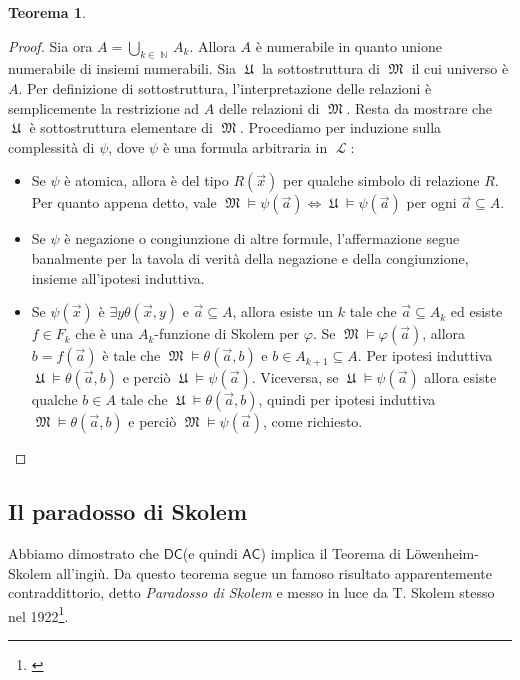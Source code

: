 \documentclass[12pt,a4paper]{report}
\theoremstyle{definition}
\newtheorem{teo}{Teorema}[section]  %
\theoremstyle{num.custom-title}
\DeclareMathOperator{\LL}{\mathcal{L}}
\DeclareMathOperator{\N}{\mathbb{N}}
\DeclareMathOperator{\M}{\mathfrak{M}}
\DeclareMathOperator{\U}{\mathfrak{U}}
\DeclareMathOperator{\sse}{\subseteq}
\newcommand{\AC}{\ensuremath{\mathsf{AC}}\xspace}
\newcommand{\DC}{\ensuremath{\mathsf{DC}}\xspace}
\renewcommand{\phi}{\varphi}
\begin{document}
\begin{teo}
\begin{proof}
Sia ora $A = \bigcup_{k \in \N} A_k$. Allora $A$ è numerabile in quanto unione numerabile di insiemi numerabili. Sia $\U$ la sottostruttura di $\M$ il cui universo è $A$. Per definizione di sottostruttura, l'interpretazione delle relazioni è semplicemente la restrizione ad $A$ delle relazioni di $\M$. Resta da mostrare che $\U$ è sottostruttura elementare di $\M$. Procediamo per induzione sulla complessità di $\psi$, dove $\psi$ è una formula arbitraria in $\LL$:
\begin{itemize}
\item Se $\psi$ è atomica, allora è del tipo $R(\vec x)$ per qualche simbolo di relazione $R$. Per quanto appena detto, vale $\M \models \psi(\vec a) \iff \U \models \psi(\vec a)$ per ogni $\vec a \sse A$.
\item Se $\psi$ è negazione o congiunzione di altre formule, l'affermazione segue banalmente per la tavola di verità della negazione e della congiunzione, insieme all'ipotesi induttiva.
\item Se $\psi(\vec x)$ è $\exists y \theta(\vec x, y)$ e $\vec a \sse A$, allora esiste un $k$ tale che $\vec a \sse A_k$ ed esiste $f \in F_k$ che è una $A_k$-funzione di Skolem per $\phi$. Se $\M \models \phi(\vec a)$, allora $b=f(\vec a)$ è tale che $\M \models \theta(\vec a, b)$ e $b \in A_{k+1} \sse A$. Per ipotesi induttiva $\U \models \theta(\vec a, b)$ e perciò $\U \models \psi(\vec a)$. Viceversa, se $\U \models \psi(\vec a)$ allora esiste qualche $b \in A$ tale che $\U \models \theta(\vec a, b)$, quindi per ipotesi induttiva $\M \models \theta(\vec a, b)$ e perciò $\M \models \psi(\vec a)$, come richiesto.
\end{itemize}
\end{proof}
\end{teo}


\subsection{Il paradosso di Skolem}

Abbiamo dimostrato che \DC (e quindi \AC) implica il Teorema di Löwenheim-Skolem all'ingiù. Da questo teorema segue un famoso risultato apparentemente contraddittorio, detto \emph{Paradosso di Skolem} e messo in luce da T. Skolem stesso nel 1922\footnote{\cite{Sko22:wiki}}.\\
\end{document}

